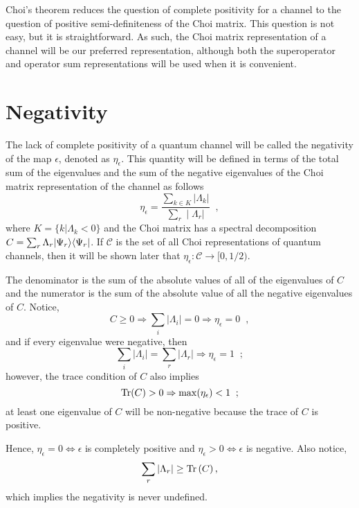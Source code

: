 Choi's theorem reduces the question of complete positivity for a channel to the question of positive semi-definiteness of the Choi matrix.  This question is not easy, but it is straightforward.  As such, the Choi matrix representation of a channel will be our preferred representation, although both the superoperator and operator sum representations will be used when it is convenient.

\section{Negativity}
\label{sec:neg}

The lack of complete positivity of a quantum channel will be called the negativity of the map $\epsilon$, denoted as $\eta_\epsilon$.  This quantity will be defined in terms of the total sum of the eigenvalues and the sum of the negative eigenvalues of the Choi matrix representation of the channel as follows
\begin{equation}
\label{eqn:negdef}
\eta_\epsilon = \frac{\sum_{k\in K} |\Lambda_k |}{\sum_r \;|\;\Lambda_r|}\;\;,
\end{equation}
where $K = \{k|\Lambda_k < 0\}$ and the Choi matrix has a spectral decomposition $C = \sum_r \Lambda_r |\Psi_r\rangle\langle\Psi_r|$.  If $\mathcal{C}$ is the set of all Choi representations of quantum channels, then it will be shown later that $\eta_\epsilon:\mathcal{C}\rightarrow[0,1/2)$.

The denominator is the sum of the absolute values of all of the eigenvalues of $C$ and the numerator is the sum of the absolute value of all the negative eigenvalues of $C$.  Notice,
$$
C\ge 0\Rightarrow \sum_i |\Lambda_i| = 0\Rightarrow \eta_\epsilon = 0\;\;,
$$
and if every eigenvalue were negative, then
$$
\sum_i|\Lambda_i| = \sum_r |\Lambda_r| \Rightarrow \eta_\epsilon = 1\;\;;
$$
however, the trace condition of $C$ also implies
$$
\operatorname{Tr}(C)>0\Rightarrow \max(\eta_\epsilon) < 1\;\;;
$$
at least one eigenvalue of $C$ will be non-negative because the trace of $C$ is positive.  

Hence, $\eta_\epsilon = 0 \Leftrightarrow\epsilon$ is completely positive and $\eta_\epsilon > 0 \Leftrightarrow\epsilon$ is negative.  Also notice,
$$
\sum_r |\Lambda_r| \ge \operatorname{Tr}\left(C\right),
$$
which implies the negativity is never undefined.  

